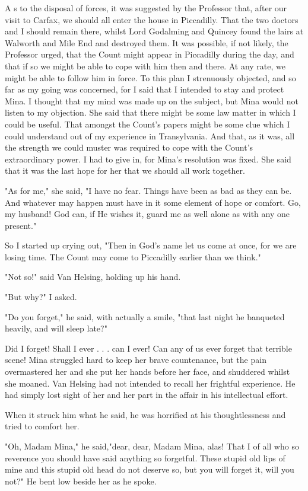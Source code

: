 A s to the disposal of forces, it was suggested by the Professor that, after our visit to Carfax, we should all enter the house in Piccadilly. That the two doctors and I should remain there, whilst Lord Godalming and Quincey found the lairs at Walworth and Mile End and destroyed them. It was possible, if not likely, the Professor urged, that the Count might appear in Piccadilly during the day, and that if so we might be able to cope with him then and there. At any rate, we might be able to follow him in force. To this plan I strenuously objected, and so far as my going was concerned, for I said that I intended to stay and protect Mina. I thought that my mind was made up on the subject, but Mina would not listen to my objection. She said that there might be some law matter in which I could be useful. That amongst the Count's papers might be some clue which I could understand out of my experience in Transylvania. And that, as it was, all the strength we could muster was required to cope with the Count's extraordinary power. I had to give in, for Mina's resolution was fixed. She said that it was the last hope for her that we should all work together. 

"As for me," she said, "I have no fear. Things have been as bad as they can be. And whatever may happen must have in it some element of hope or comfort. Go, my husband! God can, if He wishes it, guard me as well alone as with any one present." 

So I started up crying out, "Then in God's name let us come at once, for we are losing time. The Count may come to Piccadilly earlier than we think." 

"Not so!" said Van Helsing, holding up his hand. 

"But why?" I asked. 

"Do you forget," he said, with actually a smile, "that last night he banqueted heavily, and will sleep late?" 

Did I forget! Shall I ever . . . can I ever! Can any of us ever forget that terrible scene! Mina struggled hard to keep her brave countenance, but the pain overmastered her and she put her hands before her face, and shuddered whilst she moaned. Van Helsing had not intended to recall her frightful experience. He had simply lost sight of her and her part in the affair in his intellectual effort. 

When it struck him what he said, he was horrified at his thoughtlessness and tried to comfort her. 

"Oh, Madam Mina," he said,"dear, dear, Madam Mina, alas! That I of all who so reverence you should have said anything so forgetful. These stupid old lips of mine and this stupid old head do not deserve so, but you will forget it, will you not?" He bent low beside her as he spoke. 

